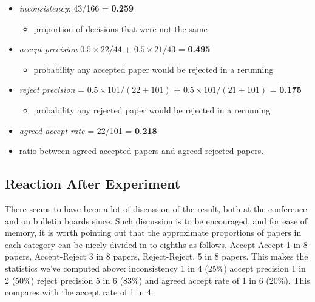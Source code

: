 \begin{itemize}
\tightlist
\item
  \emph{inconsistency}: 43/166 = \textbf{0.259}

  \begin{itemize}
  \tightlist
  \item
    proportion of decisions that were not the same
  \end{itemize}
\item
  \emph{accept precision} \(0.5 \times 22/44\) + \(0.5 \times 21/43\) =
  \textbf{0.495}

  \begin{itemize}
  \tightlist
  \item
    probability any accepted paper would be rejected in a rerunning
  \end{itemize}
\item
  \emph{reject precision} = \(0.5\times 101/(22+101)\) +
  \(0.5\times 101/(21 + 101)\) = \textbf{0.175}

  \begin{itemize}
  \tightlist
  \item
    probability any rejected paper would be rejected in a rerunning
  \end{itemize}
\item
  \emph{agreed accept rate} = 22/101 = \textbf{0.218}
\item
  ratio between agreed accepted papers and agreed rejected papers.
\end{itemize}

\hypertarget{reaction-after-experiment}{%
\subsection{Reaction After Experiment}\label{reaction-after-experiment}}

\begin{flushright}
\end{flushright}

There seems to have been a lot of discussion of the result, both at the
conference and on bulletin boards since. Such discussion is to be
encouraged, and for ease of memory, it is worth pointing out that the
approximate proportions of papers in each category can be nicely divided
in to eighths as follows. Accept-Accept 1 in 8 papers, Accept-Reject 3
in 8 papers, Reject-Reject, 5 in 8 papers. This makes the statistics
we've computed above: inconsistency 1 in 4 (25\%) accept precision 1 in
2 (50\%) reject precision 5 in 6 (83\%) and agreed accept rate of 1 in 6
(20\%). This compares with the accept rate of 1 in 4.


